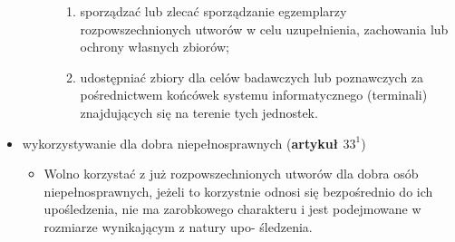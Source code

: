 \documentclass[12pt,a4paper]{article}
\begin{document}
\begin{itemize}
\begin{description}
\begin{enumerate}
					\item sporządzać lub zlecać sporządzanie egzemplarzy rozpowszechnionych 				utworów w celu uzupełnienia, zachowania lub ochrony własnych zbiorów;
					\item udostępniać zbiory dla celów badawczych lub poznawczych za pośrednictwem 				końcówek systemu informatycznego (terminali) znajdujących się na 				terenie tych jednostek.
			\end{enumerate}
	\end{description}
\item wykorzystywanie dla dobra niepełnosprawnych (\textbf{artykuł $33^1$})
	\begin{itemize}
		\item Wolno korzystać z już rozpowszechnionych utworów dla dobra osób niepełnosprawnych, jeżeli to korzystnie odnosi się bezpośrednio do ich upośledzenia, nie ma zarobkowego charakteru i jest podejmowane w rozmiarze wynikającym z natury upo- śledzenia.
	\end{itemize}
\end{itemize}
\end{document}
